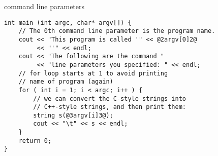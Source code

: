 \begin{frame}[fragile,label=cmdLinePEx]{command line parameters}
\begin{lstlisting}
int main (int argc, char* argv[]) {
    // The 0th command line parameter is the program name.
    cout << "This program is called '" << @2argv[0]2@
         << "'" << endl;
    cout << "The following are the command " 
         << "line parameters you specified: " << endl;
    // for loop starts at 1 to avoid printing
    // name of program (again)
    for ( int i = 1; i < argc; i++ ) {
        // we can convert the C-style strings into 
        // C++-style strings, and then print them:
        string s(@3argv[i]3@);
        cout << "\t" << s << endl;
    }
    return 0;
}
\end{lstlisting}
\end{frame}
